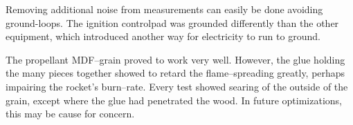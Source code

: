 Removing additional noise from measurements can easily be done avoiding ground-loops. The ignition controlpad was grounded differently than the other equipment, which introduced another way for electricity to run to ground.

The propellant MDF--grain proved to work very well. However, the glue holding the many pieces together showed to retard the flame--spreading greatly, perhaps impairing the rocket's burn--rate. Every test showed searing of the outside of the grain, except where the glue had penetrated the wood. In future optimizations, this may be cause for concern.
